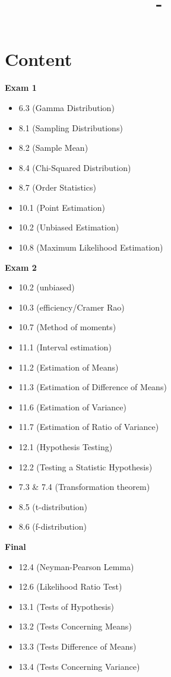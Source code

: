 \documentclass[answers,12pt,addpoints]{exam}
\author{\name}
\title{\course \ - \assignment}
\begin{document}
\maketitle
\tableofcontents

\newpage
\section*{Content}
\textbf{Exam 1}
\begin{itemize}
    \item 6.3 (Gamma Distribution)
    \item 8.1 (Sampling Distributions)
    \item 8.2 (Sample Mean)
    \item 8.4 (Chi-Squared Distribution)
    \item 8.7 (Order Statistics)
    \item 10.1 (Point Estimation)
    \item 10.2 (Unbiased Estimation)
    \item 10.8 (Maximum Likelihood Estimation)
\end{itemize}
\textbf{Exam 2}
\begin{itemize}
    \item 10.2 (unbiased)
    \item 10.3 (efficiency/Cramer Rao)
    \item 10.7 (Method of moments)
    \item 11.1 (Interval estimation)
    \item 11.2 (Estimation of Means)
    \item 11.3 (Estimation of Difference of Means)
    \item 11.6 (Estimation of Variance)
    \item 11.7 (Estimation of Ratio of Variance)
    \item 12.1 (Hypothesis Testing)
    \item 12.2 (Testing a Statistic Hypothesis)
    \item 7.3 \& 7.4 (Transformation theorem)
    \item 8.5 (t-distribution)
    \item 8.6 (f-distribution)
\end{itemize}
\textbf{Final}
\begin{itemize}
    \item 12.4 (Neyman-Pearson Lemma)
    \item 12.6 (Likelihood Ratio Test) 
    \item 13.1 (Tests of Hypothesis)
    \item 13.2 (Tests Concerning Means)
    \item 13.3 (Tests Difference of Means)
    \item 13.4 (Tests Concerning Variance)
\end{itemize}
\end{document}

